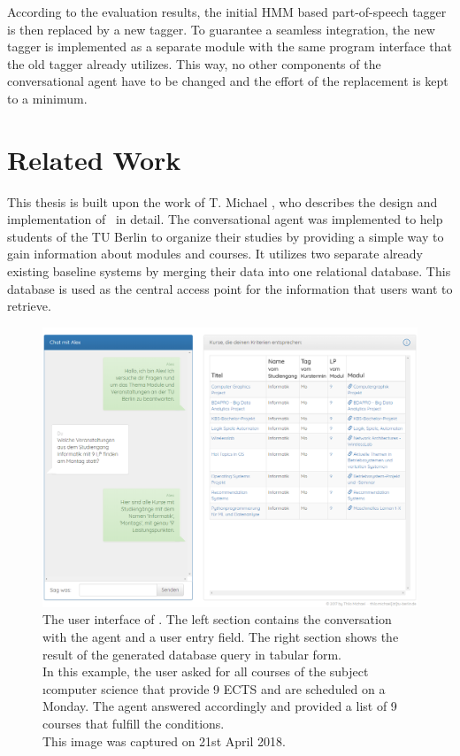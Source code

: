 According to the evaluation results, the initial HMM based part-of-speech tagger is then replaced by a new tagger. To guarantee a seamless integration, the new tagger is implemented as a separate module with the same program interface that the old tagger already utilizes. This way, no other components of the conversational agent have to be changed and the effort of the replacement is kept to a minimum.

\section{Related Work}\label{c.introduction.related}
This thesis is built upon the work of T. Michael \cite{michael2016}, who describes the design and implementation of \Alex\ in detail. The conversational agent was implemented to help students of the TU Berlin to organize their studies by providing a simple way to gain information about modules and courses. It utilizes two separate already existing baseline systems by merging their data into one relational database. This database is  used as the central access point for the information that users want to retrieve.

\begin{figure}[H]
	\includegraphics[width=\textwidth]{images/alex_screencapture}
	\caption[User Interface of \Alex]{The user interface of \Alex. The left section contains the conversation with the agent and a user entry field. The right section shows the result of the generated database query in tabular form.\\In this example, the user asked for all courses of the subject \i{computer science} that provide 9 ECTS and are scheduled on a Monday. The agent answered accordingly and provided a list of 9 courses that fulfill the conditions.\\This image was captured on 21st April 2018.}
	\label{f.alex_ui}
\end{figure}

